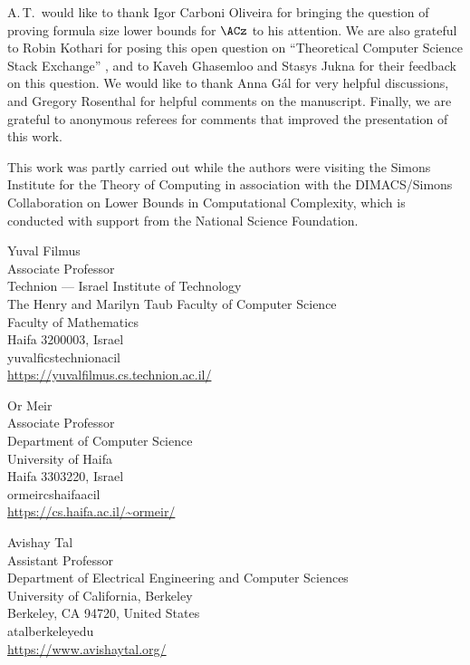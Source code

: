 \documentclass{toc}
\begin{document}
A.\,T.\ would like to thank Igor Carboni Oliveira for bringing the question
of proving formula size lower bounds for $\ACz$ to his attention.
We are also grateful to Robin Kothari for posing this open question
on ``Theoretical Computer Science Stack Exchange'' \cite{K11},
and to Kaveh Ghasemloo and Stasys Jukna for their feedback on this
question. We would like to thank Anna G{\'{a}}l for very helpful discussions,
and Gregory Rosenthal for helpful comments on the manuscript. Finally,
we are grateful to anonymous referees for comments that improved the
presentation of this work.

This work was partly carried out while the authors were visiting the
Simons Institute for the Theory of Computing in association with the
DIMACS/Simons Collaboration on Lower Bounds in Computational Complexity,
which is conducted with support from the National Science Foundation.


\nocite{conf-version}


%



%
%
%
%
%
%
%
%
%
%
%
%
%
\begin{tocauthors}
\begin{tocinfo}[filmus]
 Yuval Filmus\\
 Associate Professor\\
 Technion --- Israel Institute of Technology\\
%
 The Henry and Marilyn Taub Faculty of Computer Science\\
 Faculty of Mathematics\\
 Haifa 3200003, Israel\\
 yuvalfi\tocat{}cs\tocdot{}technion\tocdot{}ac\tocdot{}il \\   %
 \url{https://yuvalfilmus.cs.technion.ac.il/}      %
\end{tocinfo}

\begin{tocinfo}[meir]
 Or Meir\\
 Associate Professor\\
 Department of Computer Science\\
 University of Haifa\\
 Haifa 3303220, Israel\\
 ormeir\tocat{}cs\tocdot{}haifa\tocdot{}ac\tocdot{}il \\   %
 \url{https://cs.haifa.ac.il/~ormeir/}      %
\end{tocinfo}

\begin{tocinfo}[tal]
 Avishay Tal\\
 Assistant Professor\\
 Department of Electrical Engineering and Computer Sciences\\
 University of California, Berkeley\\
 Berkeley, CA 94720, United States\\
 atal\tocat{}berkeley\tocdot{}edu \\ 
 \url{https://www.avishaytal.org/}
\end{tocinfo}

\end{tocauthors}
\end{document}
